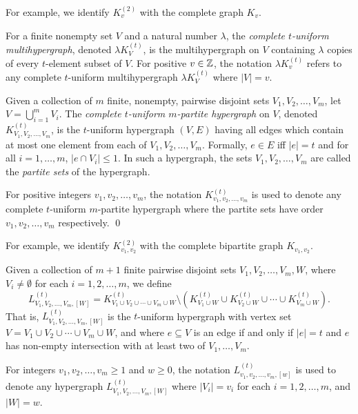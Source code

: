 For example, we identify $K_v^{(2)}$ with the complete graph $K_v$.

For a finite nonempty set $V$ and a natural number $\lambda$, the {\em complete
$t$-uniform multihypergraph}, denoted $\lambda K_{V}^{(t)}$, is the
multihypergraph on $V$ containing $\lambda$ copies of every $t$-element subset
of $V$. For positive $v \in \mathbb{Z}$, the notation $\lambda K_{v}^{(t)}$ refers to
any complete $t$-uniform multihypergraph $\lambda K_{V}^{(t)}$ where $|V| = v$.

\begin{definition}
Given a collection of $m$ finite, nonempty, pairwise disjoint sets
$V_1, V_2 ,\ldots, V_m$, let $V = \bigcup_{i=1}^{m} V_i$.
The {\em complete $t$-uniform $m$-partite hypergraph} on $V$, denoted
$K_{V_1, V_2, \ldots, V_m}^{(t)}$, is the $t$-uniform hypergraph $(V, E)$ having
all edges which contain at most one element from each of $V_1, V_2, \ldots, V_m$.
Formally, $e \in E$ iff $|e| = t$ and for all $i=1,\ldots,m$, $|e \cap V_i| \leq 1$.
In such a hypergraph, the sets $V_1, V_2, \ldots, V_m$ are called the
{\em partite sets} of the hypergraph.

For positive integers $v_1, v_2, \ldots, v_m$, the notation $K_{v_1, v_2,
\ldots, v_m}^{(t)}$ is used to denote any complete $t$-uniform $m$-partite
hypergraph where the partite sets have order $v_1, v_2, \ldots, v_m$
respectively.
\qed
\end{definition}

For example, we identify $K_{v_1, v_2}^{(2)}$ with the complete bipartite graph
$K_{v_1,v_2}$.


Given a collection of $m+1$ finite pairwise disjoint sets
$V_1, V_2, \ldots, V_m, W$, where $V_i \neq \emptyset$ for each $i = 1, 2, \ldots, m$, we define
\[
    L_{V_1, V_2, \ldots, V_m, [W]}^{(t)} = K_{V_1 \cup V_2 \cup \cdots \cup V_m \cup W}^{(t)} \setminus (K_{V_1 \cup W}^{(t)} \cup K_{V_2 \cup W}^{(t)} \cup \cdots \cup K_{V_m \cup W}^{(t)}).
\]
That is, $L_{V_1, V_2, \ldots, V_m, [W]}^{(t)}$ is the $t$-uniform hypergraph with vertex set $V = V_1 \cup V_2 \cup \cdots \cup V_m \cup W$, and where $e \subseteq V$ is an edge if and only if $|e| = t$ and $e$ has non-empty intersection with at least two of $V_1, \ldots, V_m$.

For integers $v_1, v_2, \ldots, v_m \geq 1$ and $w \geq 0$, the notation $L_{v_1, v_2, \ldots, v_m, [w]}^{(t)}$ is used to denote any hypergraph $L_{V_1, V_2, \ldots, V_m, [W]}^{(t)}$ where $|V_i| = v_i$ for each $i = 1, 2, \ldots, m$, and $|W| = w$.

